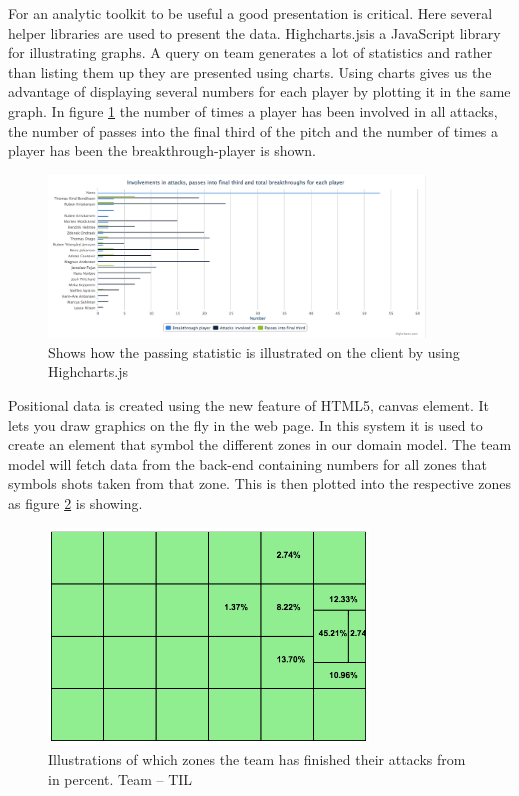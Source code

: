 For an analytic toolkit to be useful a good presentation is critical. Here several helper libraries are used to present the data. Highcharts.js\footnotemark is a JavaScript library for illustrating graphs. A query on team generates a lot of statistics and rather than listing them up they are presented using charts. Using charts gives us the advantage of displaying several numbers for each player by plotting it in the same graph. In figure \ref{fig:chart} the number of times a player has been involved in all attacks, the number of passes into the final third of the pitch and the number of times a player has been the breakthrough-player is shown.


\begin{figure}[ht!]
\centering
\includegraphics[width=100mm]{images/general/chart_passes.png}
\caption{Shows how the passing statistic is illustrated on the client by using Highcharts.js}
\label{fig:chart}
\end{figure}

Positional data is created using the new feature of HTML5, canvas element. It lets you draw graphics on the fly in the web page. In this system it is used to create an element that symbol the different zones in our domain model. The team model will fetch data from the back-end containing numbers for all zones that symbols shots taken from that zone. This is then plotted into the respective zones as figure \ref{fig:attacking_zones} is showing.

\begin{figure}[ht!]
\centering
\includegraphics[width=85mm]{images/general/finishing_zones.png}
\caption{Illustrations of which zones the team has finished their attacks from in percent. Team – \ac{TIL}}
\label{fig:attacking_zones}
\end{figure}

